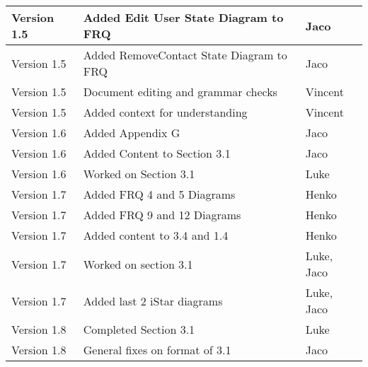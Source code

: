 \begin{center}
\begin{tabular}{|l|l|l|}
\hline
Version 1.5 & Added Edit User State Diagram to FRQ & Jaco\\
\hline
Version 1.5 & Added RemoveContact State Diagram to FRQ&Jaco\\
\hline
Version 1.5 & Document editing and grammar checks & Vincent\\
\hline
Version 1.5 & Added context for understanding & Vincent\\
\hline
Version 1.6 & Added Appendix G& Jaco\\
\hline
Version 1.6 & Added Content to Section 3.1&Jaco\\
\hline
Version 1.6 & Worked on Section 3.1&Luke\\
\hline
Version 1.7 & Added FRQ 4 and 5 Diagrams&Henko\\
\hline
Version 1.7 & Added FRQ 9 and 12 Diagrams&Henko\\
\hline
Version 1.7 & Added content to 3.4 and 1.4 &Henko\\
\hline
Version 1.7 & Worked on section 3.1&Luke, Jaco\\
\hline
Version 1.7 & Added last 2 iStar diagrams&Luke, Jaco\\
\hline
Version 1.8 & Completed Section 3.1&Luke\\
\hline
Version 1.8 & General fixes on format of 3.1&Jaco\\
\hline
\end{tabular}
\end{center}
